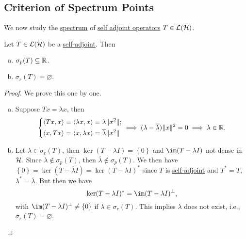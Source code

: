 \subsection{Criterion of Spectrum Points}
We now study the \hyperref[def:spectrum-point]{spectrum} of \hyperref[def:self-adjoint-op]{self adjoint operators} \(T\in \mathcal{\MakeUppercase{l}} (\mathcal{\MakeUppercase{h}} )\).
\begin{lemma}
	Let \(T\in \mathcal{\MakeUppercase{l}} (\mathcal{\MakeUppercase{h}} )\) be a \hyperref[def:self-adjoint-op]{self-adjoint}. Then
	\begin{enumerate}[(a)]
		\item \(\sigma _p(T) \subseteq \mathbb{\MakeUppercase{r}} \).
		\item \(\sigma _r(T) = \varnothing \).
	\end{enumerate}
\end{lemma}
\begin{proof}
	We prove this one by one.
	\begin{enumerate}[(a)]
		\item Suppose \(Tx=\lambda x\), then
		      \[
			      \begin{dcases}
				      \left\langle Tx, x \right\rangle = \left\langle \lambda x, x \right\rangle = \lambda \lVert x^{2}  \rVert ; \\
				      \left\langle x, Tx \right\rangle = \left\langle x, \lambda x \right\rangle = \overline{\lambda} \lVert x^{2}  \rVert
			      \end{dcases}
			      \implies (\lambda - \overline{\lambda}) \lVert x \rVert ^{2} = 0 \implies \lambda \in \mathbb{\MakeUppercase{r}} .
		      \]
		\item Let \(\lambda \in \sigma _r(T)\), then \(\ker (T-\lambda I) = \left\{ 0 \right\} \) and \(\im (T-\lambda I)\) not dense in \(\mathcal{\MakeUppercase{h}} \). Since \(\lambda \notin \sigma _p(T)\), then \(\overline{\lambda} \notin \sigma _p(T)\). We then have \(\left\{ 0 \right\} = \ker (T-\overline{\lambda} I) = \ker (T-\lambda I)^{\ast} \) since \(T\) is \hyperref[def:self-adjoint-op]{self-adjoint} and \(T^{\ast} = T\), \(\lambda ^{\ast} = \overline{\lambda} \). But then we have
		      \[
			      \ker (T-\lambda I)^{\ast} = \im (T-\lambda I)^{\perp} ,
		      \]
		      with \(\im (T-\lambda I)^{\perp} \neq \left\{ 0 \right\} \) if \(\lambda \in \sigma _r(T)\). This implies \(\lambda \) does not exist, i.e., \(\sigma _r(T)= \varnothing \).
	\end{enumerate}
\end{proof}